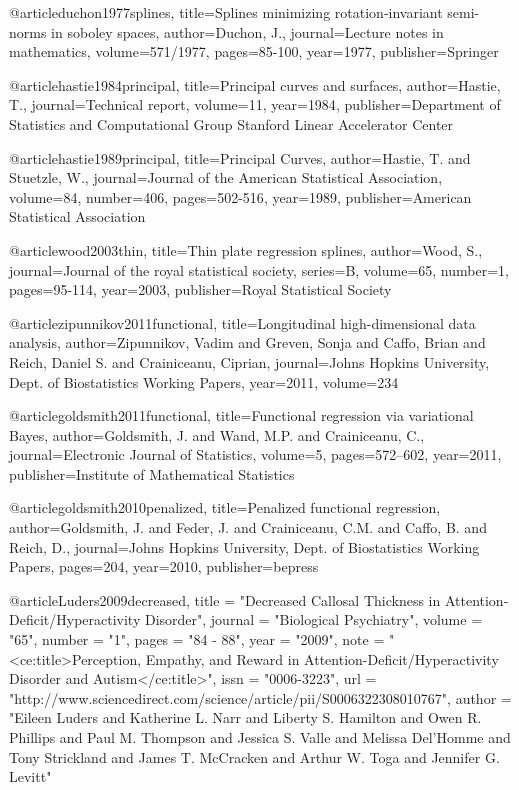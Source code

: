 @article{duchon1977splines,
  title={Splines minimizing rotation-invariant semi-norms in soboley spaces},
  author={Duchon, J.},
  journal={Lecture notes in mathematics},
  volume={571/1977},
  pages={85-100},
  year={1977},
  publisher={Springer}
  }


@article{hastie1984principal,
  title={Principal curves and surfaces},
  author={Hastie, T.},
  journal={Technical report},
  volume={11},
  year={1984},
  publisher={Department of Statistics and Computational Group
Stanford Linear Accelerator Center}
}

@article{hastie1989principal,
  title={Principal Curves},
  author={Hastie, T. and Stuetzle, W.},
  journal={Journal of the American Statistical Association},
  volume={84},
  number={406},
  pages={502-516},
  year={1989},
  publisher={American Statistical Association}
}

@article{wood2003thin,
  title={Thin plate regression splines},
  author={Wood, S.},
  journal={Journal of the royal statistical society},
  series={B},
  volume={65},
  number={1},
  pages={95-114},
  year={2003},
  publisher={Royal Statistical Society}
  }

@article{zipunnikov2011functional,
  title={Longitudinal high-dimensional data analysis},
  author={Zipunnikov, Vadim and Greven, Sonja and Caffo, Brian and Reich, Daniel S. and Crainiceanu, Ciprian},
  journal={Johns Hopkins University, Dept. of Biostatistics Working Papers},
  year={2011},
  volume={234}
}


@article{goldsmith2011functional,
  title={Functional regression via variational Bayes},
  author={Goldsmith, J. and Wand, M.P. and Crainiceanu, C.},
  journal={Electronic Journal of Statistics},
  volume={5},
  pages={572--602},
  year={2011},
  publisher={Institute of Mathematical Statistics}
}

@article{goldsmith2010penalized,
  title={Penalized functional regression},
  author={Goldsmith, J. and Feder, J. and Crainiceanu, C.M. and Caffo, B. and Reich, D.},
  journal={Johns Hopkins University, Dept. of Biostatistics Working Papers},
  pages={204},
  year={2010},
  publisher={bepress}
}

@article{Luders2009decreased,
title = "Decreased Callosal Thickness in Attention-Deficit/Hyperactivity Disorder",
journal = "Biological Psychiatry",
volume = "65",
number = "1",
pages = "84 - 88",
year = "2009",
note = "<ce:title>Perception, Empathy, and Reward in Attention-Deficit/Hyperactivity Disorder and Autism</ce:title>",
issn = "0006-3223",
url = "http://www.sciencedirect.com/science/article/pii/S0006322308010767",
author = "Eileen Luders and Katherine L. Narr and Liberty S. Hamilton and Owen R. Phillips and Paul M. Thompson and Jessica S. Valle and Melissa Del'Homme and Tony Strickland and James T. McCracken and Arthur W. Toga and Jennifer G. Levitt"
}

